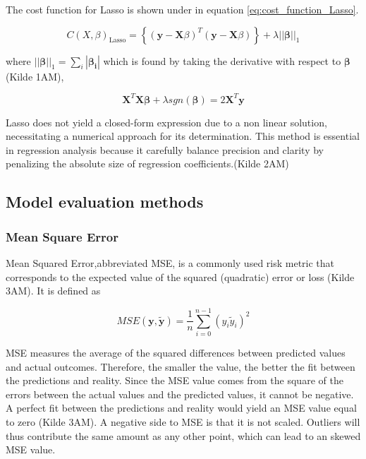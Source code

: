 \noindent The cost function for Lasso is shown under in equation \ref{eq:cost_function_Lasso}. 

\begin{equation}\label{eq:cost_function_Lasso}
    C(X,\beta)_\text{Lasso} =  \left\lbrace ( \textbf{y} - \textbf{X}\beta )^T (\textbf{y} - \textbf{X}\beta)\right\rbrace + \lambda||\boldsymbol{\beta}||_1  
\end{equation}

\noindent where $||\boldsymbol{\beta}||_1 = \sum_{i} |\boldsymbol{\beta_i}|$ which is found by taking the derivative with respect to $\boldsymbol{\beta}$ (Kilde 1AM), 

\begin{equation}\label{eq:optimal_lasso}
    \mathbf{X}^T\mathbf{X}\boldsymbol{\beta} + \lambda sgn(\boldsymbol{\beta}) = 2\mathbf{X}^T\boldsymbol{y} 
\end{equation}

\noindent Lasso does not yield a closed-form expression due to a non linear solution, necessitating a numerical approach for its
determination. 
This method is essential in regression analysis because it carefully balance precision and clarity by penalizing the absolute size of
regression coefficients.(Kilde 2AM)

\subsection{Model evaluation methods}
\subsubsection{Mean Square Error}

\noindent Mean Squared Error,abbreviated MSE, is a commonly used risk metric that corresponds to the expected value of the squared (quadratic) error or loss (Kilde 3AM). It is defined as 

\begin{equation}\label{eq:MSE} 
 MSE(\boldsymbol{y},\tilde{\boldsymbol{y}}) = \frac{1}{n} \sum_{i=0}^{n-1}(y_i \tilde{y}_i)^2
\end{equation}

\noindent MSE measures the average of the squared differences between predicted values and actual outcomes. Therefore, the smaller the
value, the better the fit between the predictions and reality. Since the MSE value comes from the square of the errors between the actual
values and the predicted values, it cannot be negative. A perfect fit between the predictions and reality would yield an MSE value equal
to zero (Kilde 3AM). A negative side to MSE is that it is not scaled. Outliers will thus contribute the same amount as any other point,
which can lead to an skewed MSE value. 

